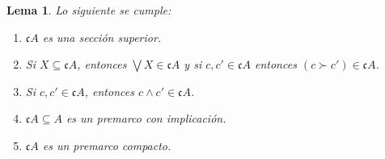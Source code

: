 \documentclass[11pt]{amsart}
\theoremstyle{plain}
\newtheorem{lem}[thm]{Lema}
\theoremstyle{definition}
\begin{document}
\begin{lem}\label{Lema2.3}
    Lo siguiente se cumple:
    \begin{enumerate}
        \item $\mathfrak{c}A$ es una sección superior.
        \item Si $X\subseteq \mathfrak{c}A$, entonces $\bigvee X\in \mathfrak{c}A$ y si $c, c'\in \mathfrak{c}A$ entonces $(c\succ c')\in \mathfrak{c}A$.
        \item Si $c, c'\in \mathfrak{c}A$, entonces $c\wedge c'\in \mathfrak{c}A$.
        \item $\mathfrak{c}A\subseteq A$ es un premarco con implicación.
        \item $\mathfrak{c}A$ es un premarco compacto.
    \end{enumerate}
\end{lem}
\end{document}
